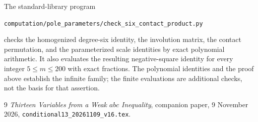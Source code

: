 \documentclass[11pt,a4paper]{article}
\begin{document}
The standard-library program
\begin{center}\small
\nolinkurl{computation/pole_parameters/check_six_contact_product.py}
\end{center}
checks the homogenized degree-six identity, the involution matrix,
the contact permutation, and the parameterized scale identities by
exact polynomial arithmetic. It also evaluates the resulting
negative-square identity for every integer $5\le m\le200$ with
exact fractions. The polynomial identities and the proof above
establish the infinite family; the finite evaluations are additional
checks, not the basis for that assertion.

\begin{thebibliography}{9}
\emph{Thirteen Variables from a Weak $abc$ Inequality},
companion paper, 9 November 2026,
\nolinkurl{conditional13_20261109_v16.tex}.
\end{thebibliography}
\end{document}
